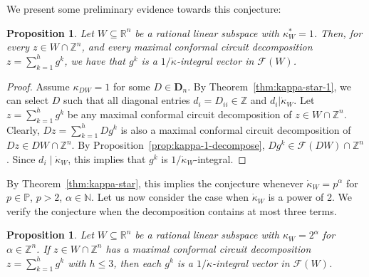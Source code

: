 \documentclass[11pt, a4paper]{article}
\newcommand{\Le}{\kappa}
\newcommand{\1}{\mathbbm{1}}
\newcommand{\kd}{{\dot{\kappa}}}
\newcommand{\primes}{\mathbb{P}}
\newcommand{\divides}{\mid}
\newcommand{\EE}{\mathcal F}
\newcommand{\bD}{\mathbf{D}}
\newtheorem{prop}[theorem]{Proposition}
\theoremstyle{case}
\newcommand{\R}{\mathbb{R}}
\newcommand{\Z}{\mathbb{Z}}
\newcommand{\N}{\mathbb{N}}
\begin{document}
We present some preliminary evidence towards this conjecture:
\begin{prop}
Let $W\subseteq\R^n$ be a rational linear subspace with $\Le^*_W=1$. Then, for every $z\in W\cap \Z^n$, and every maximal conformal circuit decomposition
$z=\sum_{k=1}^h g^k$, 
we have that $g^k$ is  a $1/\dot\kappa$-integral  vector in $\EE(W)$.  
\end{prop}
\begin{proof}
Assume $\Le_{DW}=1$ for some $D\in \bD_n$. By Theorem~\ref{thm:kappa-star-1}, 
we can select $D$ such that all diagonal entries $d_i=D_{ii}\in \Z$ and $d_i|\kd_W$. Let $z=\sum_{k=1}^h g^k$ be any maximal conformal circuit decomposition of $z\in W\cap \Z^n$. Clearly, $Dz=\sum_{k=1}^h Dg^k$ is also a
maximal conformal circuit decomposition of $Dz\in DW\cap \Z^n$. 
By Proposition~\ref{prop:kappa-1-decompose}, $Dg^k\in \EE(DW)\cap \Z^n$. Since $d_i \divides \kd_W$, this implies that $g^k$ is $1/\kd_W$-integral.
\end{proof}
By Theorem~\ref{thm:kappa-star}, this implies the conjecture whenever $\kd_W=p^\alpha$ for $p\in\primes$, $p>2$, $\alpha\in \N$. Let us now consider the case when $\kd_W$ is a power of 2. We verify the conjecture when the decomposition contains at most three terms.
\begin{prop}
Let $W\subseteq\R^n$ be a rational linear subspace with $\Le_W=2^\alpha$ for $\alpha\in \Z^n$. If $z\in W\cap \Z^n$ has a maximal conformal circuit decomposition
$z=\sum_{k=1}^h g^k$ with $h\le 3$, then each
 $g^k$ is  a $1/\dot\kappa$-integral  vector in $\EE(W)$.  
\end{prop}
\end{document}
